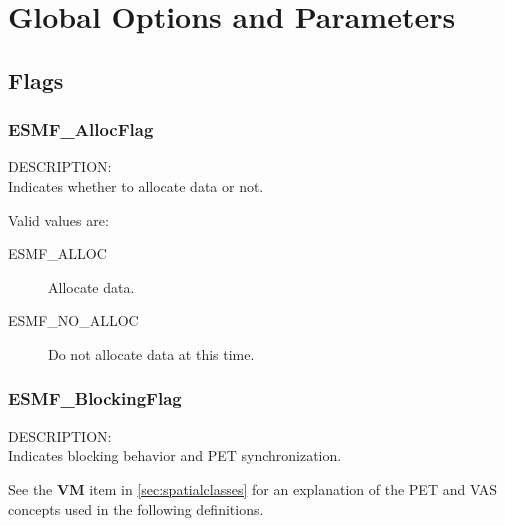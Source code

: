 
\section{Global Options and Parameters}

\subsection{Flags}

\subsubsection{ESMF\_AllocFlag}
\label{opt:allocflag}
{\sf DESCRIPTION:\\}  
Indicates whether to allocate data or not.

Valid values are:
\begin{description}
\item [ESMF\_ALLOC]
      Allocate data. 
\item [ESMF\_NO\_ALLOC]
      Do not allocate data at this time. 
\end{description}

\subsubsection{ESMF\_BlockingFlag}
\label{opt:blockingflag}
{\sf DESCRIPTION:\\}  
Indicates blocking behavior and PET synchronization.

See the {\bf VM} item in \ref{sec:spatialclasses} for an
explanation of the PET and VAS concepts used in the following
definitions.
         
